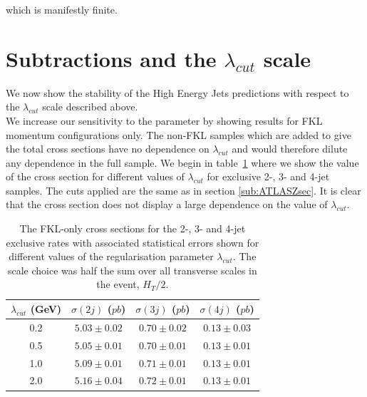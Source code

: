 		which is manifestly finite.

\section{Subtractions and the $\lambda_{cut}$ scale}
	\label{sec:indep-lambd}

	We now show the stability of the High Energy Jets predictions with respect to the
	$\lambda_{cut}$ scale described above.\\We
	increase our sensitivity to the parameter by showing results for FKL momentum
	configurations only.  The non-FKL samples which are added to give the total
	cross sections have no dependence on $\lambda_{cut}$ and would therefore dilute
	any dependence in the full sample.  We begin in table~\ref{tab:lambdaxs} where we show the value of
	the cross section for different values of $\lambda_{cut}$ for exclusive 2-, 3-
	and 4-jet samples.  The cuts applied are the same as in section \ref{sub:ATLASZsec}.
	It is clear that the cross section does not display a large dependence on the
	value of $\lambda_{cut}$.

	\begin{table}[htp!]
		\begin{center}
		\begin{tabular}{| c | c | c | c |}
		\hline
		$\lambda_{cut}$ (GeV) & $\sigma(2j)$ ($pb$) & $\sigma(3j)$ ($pb$) & $\sigma(4j)$ ($pb$) \\ \hline
		0.2 & $5.03 \pm 0.02$ & $0.70 \pm 0.02$ & $0.13 \pm 0.03$ \\
		0.5 & $5.05 \pm 0.01$ & $0.70 \pm 0.01$ & $0.13 \pm 0.01$ \\
		1.0 & $5.09 \pm 0.01$ & $0.71 \pm 0.01$ & $0.13 \pm 0.01$ \\
		2.0 & $5.16 \pm 0.04$ & $0.72 \pm 0.01$ & $0.13 \pm 0.01$ \\ \hline
		\end{tabular}
		\caption{The FKL-only cross sections for the 2-, 3- and 4-jet exclusive rates
		with associated statistical errors shown for different values of the regularisation parameter
		$\lambda_{cut}$.  The scale choice was half the sum over all transverse scales in the event, $H_T/2$.}
		\label{tab:lambdaxs}
		\end{center}
	\end{table}


